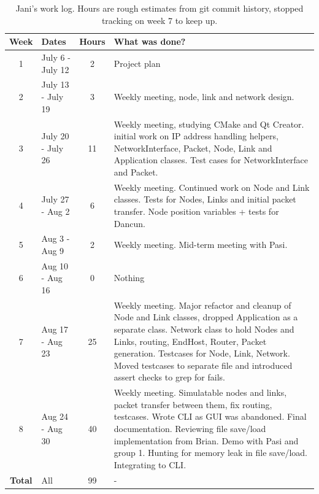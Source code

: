 \begin{table}[!htbp]
\footnotesize{
\begin{tabular}{c|p{}|c|p{}}
\textbf{Week} & \textbf{Dates} & \textbf{Hours} & \textbf{What was done?} \\
\hline 1 & July 6 - July 12     & 2 & Project plan \\
\hline 2 & July 13 - July 19    & 3 & Weekly meeting, node, link and network design. \\
\hline 3 & July 20 - July 26    & 11 & Weekly meeting, studying CMake and Qt Creator. initial work on IP address handling helpers, NetworkInterface, Packet, Node, Link and Application classes. Test cases for NetworkInterface and Packet.  \\
\hline 4 & July 27 - Aug 2      & 6 & Weekly meeting. Continued work on Node and Link classes. Tests for Nodes, Links and initial packet transfer. Node position variables + tests for Dancun. \\
\hline 5 & Aug 3 - Aug 9        & 2 & Weekly meeting. Mid-term meeting with Pasi. \\
\hline 6 & Aug 10 - Aug 16      & 0 & Nothing \\
\hline 7 & Aug 17 - Aug 23      & 25 & Weekly meeting. Major refactor and cleanup of Node and Link classes, dropped Application as a separate class. Network class to hold Nodes and Links, routing, EndHost, Router, Packet generation. Testcases for Node, Link, Network. Moved testcases to separate file and introduced assert checks to grep for fails.  \\
\hline 8 & Aug 24 - Aug 30      & 40 & Weekly meeting. Simulatable nodes and links, packet transfer between them, fix routing, testcases. Wrote CLI as GUI was abandoned. Final documentation. Reviewing file save/load implementation from Brian. Demo with Pasi and group 1. Hunting for memory leak in file save/load. Integrating to CLI. \\
\hline\hline\textbf{Total}&All  & 99 & - \\
\end{tabular}
}
\caption{Jani's work log. Hours are rough estimates from git commit history, stopped tracking on week 7 to keep up.}
\label{table:worklog-jani}
\end{table}

